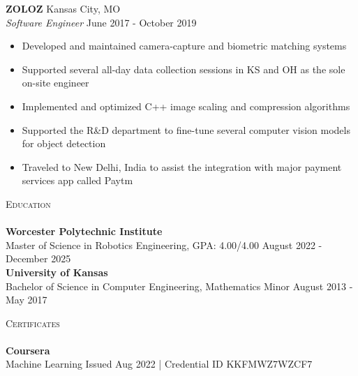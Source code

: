 \documentclass[a4paper]{article}
\newcommand{\lineunder} {
    \vspace*{-8pt} \\
    \hspace*{-18pt} \hrulefill \\
}
\newcommand{\header} [1] {
    {\hspace*{-18pt}\vspace*{6pt} \textsc{#1}}
    \vspace*{-6pt} \lineunder
}
\begin{document}
\textbf{ZOLOZ} \hfill Kansas City, MO\\
\textit{Software Engineer} \hfill June 2017 - October 2019\\
\vspace{-1mm}
\begin{itemize} \itemsep 1pt
	\item Developed and maintained camera-capture and biometric matching systems
	\item Supported several all-day data collection sessions in KS and OH as the sole on-site engineer
	\item Implemented and optimized C++ image scaling and compression algorithms
	\item Supported the R\&D department to fine-tune several computer vision models for object detection
	\item Traveled to New Delhi, India to assist the integration with major payment services app called Paytm
\end{itemize}

\header{Education}
\textbf{Worcester Polytechnic Institute}\\
Master of Science in Robotics Engineering, GPA: 4.00/4.00 \hfill August 2022 - December 2025\\
\vspace{2mm}
\textbf{University of Kansas}\\
Bachelor of Science in Computer Engineering, Mathematics Minor \hfill August 2013 - May 2017\\
\vspace{2mm}

\header{Certificates}
{\textbf{Coursera}}\\
\vspace{2mm}
Machine Learning \hfill Issued Aug 2022 | \footnotesize{Credential ID KKFMWZ7WZCF7}

\ 
\end{document}
